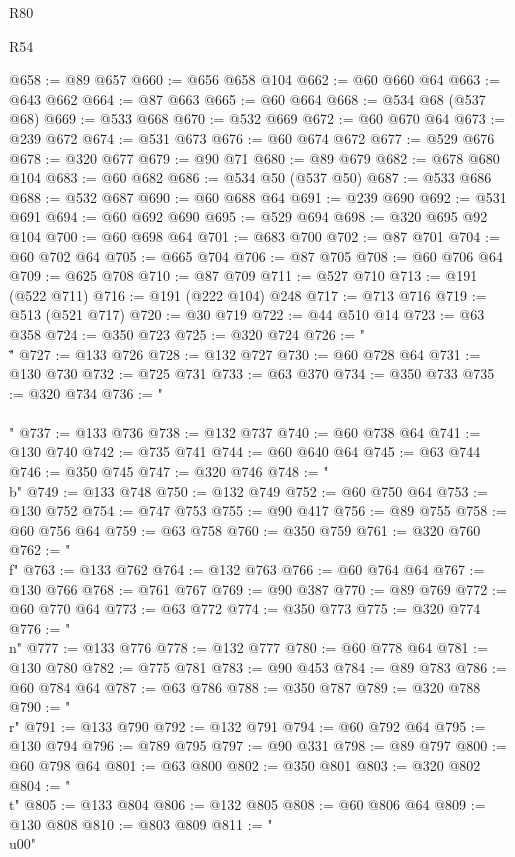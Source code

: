 \begin{lexlean}{R80}
\begin{lexlean}{R54}
\begin{coremodule}
{{{{{{{{{{{{{{{{{{{{{{{{{{{{{{{{{{{{{{{{{{{{{{{{{{@658 := @89 @657
@660 := @656 @658 @104
@662 := @60 @660 @64
@663 := @643 @662
@664 := @87 @663
@665 := @60 @664
@668 := @534 @68 (@537 @68)
@669 := @533 @668
@670 := @532 @669
@672 := @60 @670 @64
@673 := @239 @672
@674 := @531 @673
@676 := @60 @674 @672
@677 := @529 @676
@678 := @320 @677
@679 := @90 @71
@680 := @89 @679
@682 := @678 @680 @104
@683 := @60 @682
@686 := @534 @50 (@537 @50)
@687 := @533 @686
@688 := @532 @687
@690 := @60 @688 @64
@691 := @239 @690
@692 := @531 @691
@694 := @60 @692 @690
@695 := @529 @694
@698 := @320 @695 @92 @104
@700 := @60 @698 @64
@701 := @683 @700
@702 := @87 @701
@704 := @60 @702 @64
@705 := @665 @704
@706 := @87 @705
@708 := @60 @706 @64
@709 := @625 @708
@710 := @87 @709
@711 := @527 @710
@713 := @191 (@522 @711)
@716 := @191 (@222 @104) @248
@717 := @713 @716
@719 := @513 (@521 @717)
@720 := @30 @719
@722 := @44 @510 @14
@723 := @63 @358
@724 := @350 @723
@725 := @320 @724
@726 := "\\\""
@727 := @133 @726
@728 := @132 @727
@730 := @60 @728 @64
@731 := @130 @730
@732 := @725 @731
@733 := @63 @370
@734 := @350 @733
@735 := @320 @734
@736 := "\\\\"
@737 := @133 @736
@738 := @132 @737
@740 := @60 @738 @64
@741 := @130 @740
@742 := @735 @741
@744 := @60 @640 @64
@745 := @63 @744
@746 := @350 @745
@747 := @320 @746
@748 := "\\b"
@749 := @133 @748
@750 := @132 @749
@752 := @60 @750 @64
@753 := @130 @752
@754 := @747 @753
@755 := @90 @417
@756 := @89 @755
@758 := @60 @756 @64
@759 := @63 @758
@760 := @350 @759
@761 := @320 @760
@762 := "\\f"
@763 := @133 @762
@764 := @132 @763
@766 := @60 @764 @64
@767 := @130 @766
@768 := @761 @767
@769 := @90 @387
@770 := @89 @769
@772 := @60 @770 @64
@773 := @63 @772
@774 := @350 @773
@775 := @320 @774
@776 := "\\n"
@777 := @133 @776
@778 := @132 @777
@780 := @60 @778 @64
@781 := @130 @780
@782 := @775 @781
@783 := @90 @453
@784 := @89 @783
@786 := @60 @784 @64
@787 := @63 @786
@788 := @350 @787
@789 := @320 @788
@790 := "\\r"
@791 := @133 @790
@792 := @132 @791
@794 := @60 @792 @64
@795 := @130 @794
@796 := @789 @795
@797 := @90 @331
@798 := @89 @797
@800 := @60 @798 @64
@801 := @63 @800
@802 := @350 @801
@803 := @320 @802
@804 := "\\t"
@805 := @133 @804
@806 := @132 @805
@808 := @60 @806 @64
@809 := @130 @808
@810 := @803 @809
@811 := "\\u00"
}}}}}}}}}}}}}}}}}}}}}}}}}}}}}}}}}}}}}}}}}}}}}}}}}}
\end{coremodule}
\end{lexlean}
\end{lexlean}
